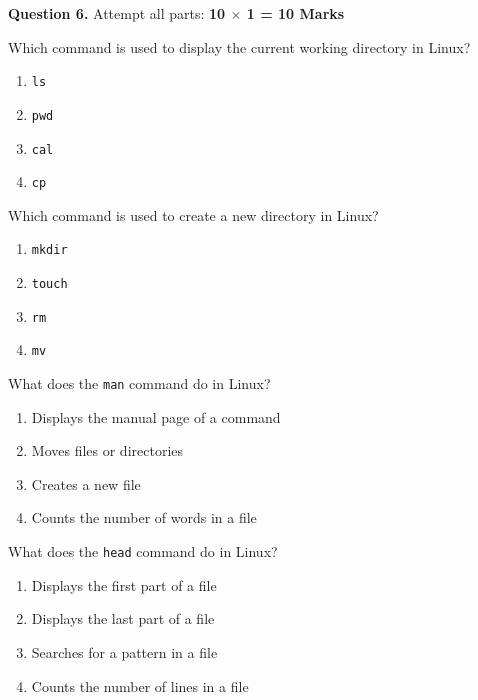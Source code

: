 \documentclass[11pt,a4paper]{article}
\begin{document}
\noindent   \textbf{Question 6.} Attempt all parts: \hfill   \textbf{10 $ \times$ 1 = 10 Marks}

\begin{parts}
  \item Which command is used to display the current working directory in Linux?
  
\begin{enumerate}[label=(\alph*),itemsep=2pt]
    \item   \texttt{ls}
    \item   \texttt{pwd}
    \item   \texttt{cal}
    \item   \texttt{cp}
  \end{enumerate}
  
  \item Which command is used to create a new directory in Linux?
  
\begin{enumerate}[label=(\alph*),itemsep=2pt]
    \item   \texttt{mkdir}
    \item   \texttt{touch}
    \item   \texttt{rm}
    \item   \texttt{mv}
  \end{enumerate}
  
  \item What does the   \texttt{man} command do in Linux?
  
\begin{enumerate}[label=(\alph*),itemsep=2pt]
    \item Displays the manual page of a command
    \item Moves files or directories
    \item Creates a new file
    \item Counts the number of words in a file
  \end{enumerate}
  
  \item What does the   \texttt{head} command do in Linux?
  
\begin{enumerate}[label=(\alph*),itemsep=2pt]
    \item Displays the first part of a file
    \item Displays the last part of a file
    \item Searches for a pattern in a file
    \item Counts the number of lines in a file
  \end{enumerate}
  

\end{parts}
\end{document}
